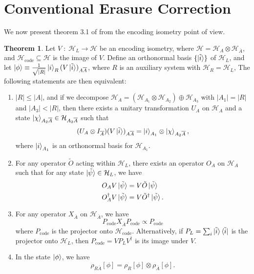 \documentclass[12pt,a4paper]{report}
\numberwithin{equation}{section}
\newcommand{\ketbra}[2]{\ket{#1}\bra{#2}}
\newcommand{\ketbras}[1]{\ketbra{#1}{#1}}
\newcommand{\Pc}{P_{\text{code}}}
\newcommand{\Hcode}{\mathcal{H}_{\text{code}}}
\newcommand{\ol}[1]{\overline{#1}}
\theoremstyle{definition}
\theoremstyle{theorem}
\newtheorem{theorem}{Theorem}[section]
\theoremstyle{theorem}
\theoremstyle{example}
\theoremstyle{definition}
\begin{document}
\section{Conventional Erasure Correction}
We now present theorem 3.1 of \cite{Harlow} from the encoding isometry point of view.
\begin{theorem}
	Let $V\;:\;\mathcal{H}_{L}\to\mathcal{H}$ be an encoding isometry, where $\mathcal{H}=\mathcal{H}_{A}\otimes\mathcal{H}_{\ol{A}}$, and $\Hcode\subseteq\mathcal{H}$ is the image of $V$. Define an orthonormal basis $\{\ket{\tilde{i}}\}$ of $\mathcal{H}_{L}$, and let $\ket{\phi}\equiv\frac{1}{\sqrt{|R|}}\ket{i}_{R}(V\ket{\tilde{i}})_{A\ol{A}}$, where $R$ is an auxiliary system with $\mathcal{H}_{R}=\mathcal{H}_{L}$, The following statements are then equivalent:
	\begin{enumerate}
		\item $|R|\leq|A|$, and if we decompose $\mathcal{H}_{A}=(\mathcal{H}_{A_{1}}\otimes\mathcal{H}_{A_{2}})\oplus\mathcal{H}_{A_{3}}$ with $|A_{1}|=|R|$ and $|A_{3}|<|R|$, then there exists a unitary transformation $U_{A}$ on $\mathcal{H}_{A}$ and a state $\ket{\chi}_{A_{2}\ol{A}}\in\mathcal{H}_{A_{2}\ol{A}}$ such that 
		\begin{equation}\label{C1}
			(U_{A}\otimes I_{\ol{A}})(V\ket{\tilde{i}})_{A\ol{A}}=\ket{i}_{A_{1}}\otimes\ket{\chi}_{A_{2}\ol{A}},
		\end{equation}
		where $\ket{i}_{A_{1}}$ is an orthonormal basis for $\mathcal{H}_{A_{1}}$.
		\item For any operator $\tilde{O}$ acting within $\mathcal{H}_{L}$, there exists an operator $O_{A}$ on $\mathcal{H}_{A}$ such that for any state $\ket{\tilde{\psi}}\in\mathcal{H}_{L}$, we have
		\begin{equation}\label{C2}
			\begin{aligned}
				O_{A}V\ket{\tilde{\psi}}&=V\tilde{O}\ket{\tilde{\psi}}\\
				O_{A}^{\dagger}V\ket{\tilde{\psi}}&=V\tilde{O}^{\dagger}\ket{\tilde{\psi}}.
			\end{aligned}
		\end{equation}
		\item For any operator $X_{\ol{A}}$ on $\mathcal{H}_{\ol{A}}$, we have
		\begin{equation}\label{C3}
			\Pc X_{\ol{A}}\Pc\propto\Pc
		\end{equation}
		where $\Pc$ is the projector onto $\Hcode$. Alternatively, if $P_{L}=\sum_{i}\ketbras{\tilde{i}}$ is the projector onto $\mathcal{H}_{L}$, then $\Pc=VP_{L}V^{\dagger}$ is its image under $V$.
		\item In the state $\ket{\phi}$, we have
		\begin{equation}\label{C4}
			\rho_{R\ol{A}}[\phi]=\rho_{R}[\phi]\otimes\rho_{\ol{A}}[\phi].
		\end{equation}
	\end{enumerate}
\end{theorem}
\end{document}
